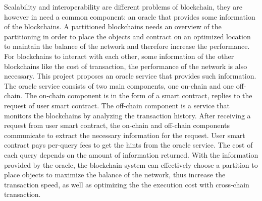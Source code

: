 Scalability and interoperability are different problems of blockchain, they are
however in need a common component: an oracle that provides some information of
the blockchains. A partitioned blockchains needs an overview of the partitioning
in order to place the objects and contract on an optimized location to maintain
the balance of the network and therefore increase the performance. For
blockchains to interact with each other, some information of the other
blockchains like the cost of transaction, the performance of the network is also
necessary. This project proposes an oracle service that provides such
information. The oracle service consists of two main components, one on-chain
and one off-chain. The on-chain component is in the form of a smart contract,
replies to the request of user smart contract. The off-chain component is a
service that monitors the blockchains by analyzing the transaction history.
After receiving a request from user smart contract, the on-chain and off-chain
components communicate to extract the necessary information for the request.
User smart contract pays per-query fees to get the hints from the oracle
service. The cost of each query depends on the amount of information returned.
With the information provided by the oracle, the blockchain system can
effectively choose a partition to place objects to maximize the balance of the
network, thus increase the transaction speed, as well as optimizing the the
execution cost with cross-chain transaction.



